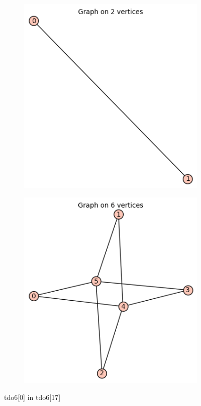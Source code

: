 \documentclass[12pt, a4paper]{article}
\begin{document}
\begin{center}
\begin{figure}[!htb]
\centering
\begin{subfigure}{0.5\textwidth}
  \centering
  \includegraphics[width=0.4\linewidth]{tdo6[0]}
\end{subfigure}%
\begin{subfigure}{0.5\textwidth}
  \centering
  \includegraphics[width=0.5\linewidth]{tdo6[17]}
\end{subfigure}
\caption{tdo6[0] in tdo6[17]}
\label{fig:test}
\end{figure}


\end{center}
\end{document}
